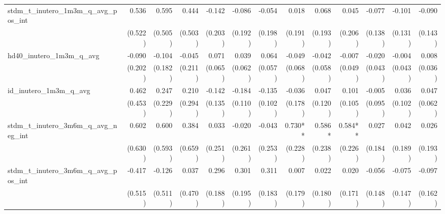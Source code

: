 \begin{tabular}{lrrrrrrrrrrrr}
stdm\_t\_inutero\_1m3m\_q\_avg\_pos\_int    &        0.536 &        0.595 &        0.444 &       -0.142 &       -0.086 &       -0.054 &        0.018 &        0.068 &        0.045 &       -0.077 &       -0.101 &       -0.090 \\ 
                                            &      (0.522) &      (0.505) &      (0.503) &      (0.203) &      (0.192) &      (0.198) &      (0.191) &      (0.193) &      (0.206) &      (0.138) &      (0.131) &      (0.143) \\ 
hd40\_inutero\_1m3m\_q\_avg                 &       -0.090 &       -0.104 &       -0.045 &        0.071 &        0.039 &        0.064 &       -0.049 &       -0.042 &       -0.007 &       -0.020 &       -0.004 &        0.008 \\ 
                                            &      (0.202) &      (0.182) &      (0.211) &      (0.065) &      (0.062) &      (0.057) &      (0.068) &      (0.058) &      (0.049) &      (0.043) &      (0.043) &      (0.036) \\ 
id\_inutero\_1m3m\_q\_avg                   &        0.462 &        0.247 &        0.210 &       -0.142 &       -0.184 &       -0.135 &       -0.036 &        0.047 &        0.101 &       -0.005 &        0.036 &        0.047 \\ 
                                            &      (0.453) &      (0.229) &      (0.294) &      (0.135) &      (0.110) &      (0.102) &      (0.178) &      (0.120) &      (0.105) &      (0.095) &      (0.102) &      (0.062) \\ 
stdm\_t\_inutero\_3m6m\_q\_avg\_neg\_int    &        0.602 &        0.600 &        0.384 &        0.033 &       -0.020 &       -0.043 &      0.730** &       0.586* &      0.584** &        0.027 &        0.042 &        0.026 \\ 
                                            &      (0.630) &      (0.593) &      (0.659) &      (0.251) &      (0.261) &      (0.253) &      (0.228) &      (0.238) &      (0.226) &      (0.184) &      (0.189) &      (0.193) \\ 
stdm\_t\_inutero\_3m6m\_q\_avg\_pos\_int    &       -0.417 &       -0.126 &        0.037 &        0.296 &        0.301 &        0.311 &        0.007 &        0.022 &        0.020 &       -0.056 &       -0.075 &       -0.097 \\ 
                                            &      (0.515) &      (0.511) &      (0.470) &      (0.188) &      (0.195) &      (0.183) &      (0.179) &      (0.180) &      (0.171) &      (0.148) &      (0.147) &      (0.162) \\ 

\end{tabular}
